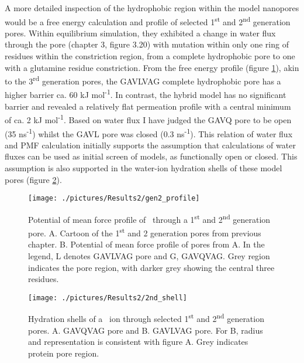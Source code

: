 A more detailed inspection of the hydrophobic region within the model nanopores would be a free energy calculation and profile of selected 1\textsuperscript{st} and 2\textsuperscript{nd} generation pores. Within equilibrium simulation, they exhibited a change in water flux through the pore (chapter 3, figure 3.20) with mutation within only one ring of residues within the constriction region, from a complete hydrophobic pore to one with a glutamine residue constriction. From the free energy profile (figure \ref{fig:gen2_profile}), akin to the 3\textsuperscript{rd} generation pores, the GAVLVAG complete hydrophobic pore has a higher barrier ca. 60 kJ mol\textsuperscript{-1}. In contrast, the hybrid model has no significant barrier and revealed a relatively flat permeation profile with a central minimum of ca. 2 kJ mol\textsuperscript{-1}. Based on water flux I have judged the GAVQ pore to be open (35 ns\textsuperscript{-1}) whilst the GAVL pore was closed (0.3 ns\textsuperscript{-1}). This relation of water flux and PMF calculation initially supports the assumption that calculations of water fluxes can be used as initial screen of models, as functionally open or closed. This assumption is also supported in the water-ion hydration shells of these model pores (figure \ref{fig:2nd_shell}). 


\begin{figure}[H]
\begin{center}
\texttt{[image: ./pictures/Results2/gen2\_profile]}
\caption[Potential of mean force profile of \Cl\ through a 1\textsuperscript{st} and 2\textsuperscript{nd} generation pore.] {Potential of mean force profile of \Cl\ through a 1\textsuperscript{st} and 2\textsuperscript{nd} generation pore.  A. Cartoon of the 1\textsuperscript{st} and 2 generation pores from previous chapter. B. Potential of mean force profile of pores from A. In the legend, L denotes GAVLVAG pore and G,  GAVQVAG. Grey region indicates the pore region, with darker grey showing the central three residues.}
\label{fig:gen2_profile}
\end{center}
\end{figure}

\begin{figure}[H]
\begin{center}
\texttt{[image: ./pictures/Results2/2nd\_shell]}
\caption[Hydration shells of a \Cl\ ion through selected 1\textsuperscript{st} and 2\textsuperscript{nd} generation pores.] {Hydration shells of a \Cl\ ion through selected 1\textsuperscript{st} and 2\textsuperscript{nd} generation pores. A. GAVQVAG pore and B. GAVLVAG pore. For B, radius and representation is consistent with figure A. Grey indicates protein pore region.} %
\label{fig:2nd_shell}
\end{center}
\end{figure}

